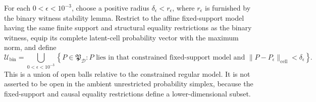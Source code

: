 For each \(0<\epsilon<10^{-3}\), choose a positive radius \(\delta_\epsilon<r_\epsilon\), where \(r_\epsilon\) is furnished by the binary witness stability lemma.  Restrict to the affine fixed-support model having the same finite support and structural equality restrictions as the binary witness, equip its complete latent-cell probability vector with the maximum norm, and define
\[
 \mathcal U_{\mathrm{bin}}
 =\bigcup_{0<\epsilon<10^{-3}}
 \left\{P\in\mathfrak P_{\mathcal D}:
 P\text{ lies in that constrained fixed-support model and }
 \|P-P_\epsilon\|_{\mathrm{cell}}<\delta_\epsilon\right\}.
\]
This is a union of open balls relative to the constrained regular model.  It is not asserted to be open in the ambient unrestricted probability simplex, because the fixed-support and causal equality restrictions define a lower-dimensional subset.